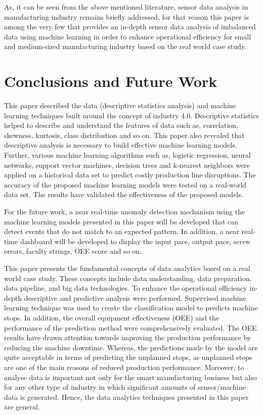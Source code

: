\documentclass[runningheads]{llncs}
\begin{document}
As, it can be seen from the above mentioned literature, sensor data analysis in manufacturing industry remains briefly addressed, for that reason this paper is among the very few that provides an in-depth sensor data analysis of imbalanced data using machine learning in order to enhance operational efficiency for small and medium-sized manufacturing industry based on the real world case study.

\section{Conclusions and Future Work}
\label{sec:conclusionandfuturework}
This paper described the data (descriptive statistics analysis) and machine learning techniques built around the concept of industry 4.0. Descriptive statistics helped to describe and understand the features of data such as, correlation, skewness, kurtosis, class distribution and so on. This paper also revealed that descriptive analysis is necessary to build effective machine learning models. Further, various machine learning algorithms such as, logistic regression, neural networks, support vector machines, decision trees and k-nearest neighbors were applied on a historical data set to predict costly production line disruptions. The accuracy of the proposed machine learning models were tested on a real-world data set. The results have validated the effectiveness of the proposed models.



\iffalse





\fi

For the future work, a near real-time anomaly detection mechanism using the machine learning models presented in this paper will be developed that can detect events that do not match to an expected pattern. In addition, a near real-time dashboard will be developed to display the input pace, output pace, screw errors, faculty strings, OEE score and so on.

\iffalse
This paper presents the fundamental concepts of data analytics based on a real world case study. These concepts include data understanding, data preparation,  data pipeline, and big data technologies. To enhance the operational efficiency in-depth descriptive and predictive analysis were performed. Supervised machine learning technique was used to create the classification model to predicts machine stops. In addition, the overall equipment effectiveness (OEE) and the performance of the prediction method were comprehensively evaluated. The OEE results have drawn attention towards improving the production performance by reducing the  machine downtime. Whereas, the predictions made by the model are quite acceptable in terms of predicting the unplanned stops, as unplanned stops are one of the main reasons of reduced production performance. Moreover, to analyse data is important not only for the smart manufacturing business but also for any other type of industry in which significant amounts of sensor/machine data is generated. Hence, the data analytics techniques presented in this paper are general.
\end{document}
